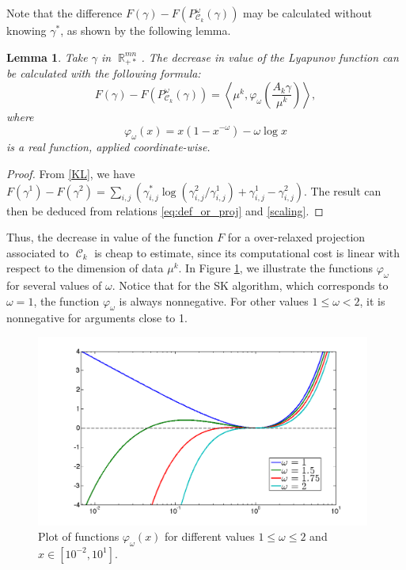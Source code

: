 \documentclass{article} %
\newcommand{\scal}[2]{\left\langle #1 , #2 \right\rangle}
\DeclareMathOperator{\IR}{\mathbb{R}}
\DeclareMathOperator{\Ccal}{\mathcal{C}}
\theoremstyle{plain}
\newtheorem{lemma}{Lemma}
\theoremstyle{definition}
\theoremstyle{remark}
\begin{document}
Note that the difference $F(\gamma) - F(P^\omega_{\Ccal_k}(\gamma))$ may be calculated without knowing $\gamma^*$, as shown by the following lemma.
\begin{lemma}\label{lemma:lyapunov_decrease}
	Take $\gamma$ in $\IR^{mn}_{+*}$. The decrease in value of the Lyapunov function can be calculated with the following formula:
	\begin{equation} \label{eq:kl_diff_scal}
	F(\gamma) - F(P^\omega_{\Ccal_k}(\gamma)) = 
	\scal{\mu^k}{\varphi_\omega \left(\frac{A_k \gamma}{\mu^k}\right)},
	\end{equation}
	where
	\begin{equation}
	\varphi_\omega(x) = x(1-x^{-\omega}) - \omega \log x
	\end{equation}
	is a real function, applied coordinate-wise.
\end{lemma}
\begin{proof}
From \eqref{KL}, we have $F(\gamma^1)-F(\gamma^2)= \sum_{i,j}\left(\gamma^*_{i,j}\log(\gamma^2_{i,j}/\gamma^1_{i,j})+\gamma^1_{i,j}-\gamma^2_{i,j}\right)$. The result can then be deduced from relations \eqref{eq:def_or_proj} and \eqref{scaling}.
\end{proof}
Thus,  the decrease in value of the function $F$ for a over-relaxed projection associated to $\Ccal_k$ is cheap to estimate, since its computational cost is  linear with respect to the dimension of data $\mu^k$. In Figure \ref{phi_omega}, we illustrate the functions  $\varphi_\omega$ for several values of $\omega$.
Notice that for the SK algorithm, which corresponds to $\omega=1$, the function $\varphi_\omega$ is always nonnegative. For other values $1\le\omega<2$, it is nonnegative for arguments close to 1.
\begin{figure}[ht!]
\begin{center}
\includegraphics[width=11cm]{phi_omega.png}
\caption{\label{phi_omega} Plot of functions $\varphi_\omega(x)$ for different values $1\leq \omega\leq 2$ and   $x\in[10^{-2}, 10^1]$.}
\end{center}
\end{figure}
\end{document}
